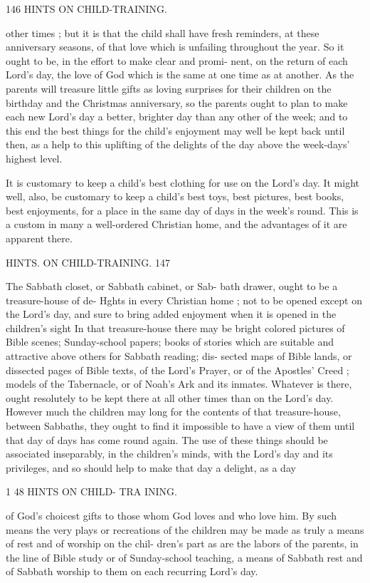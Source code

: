 \documentclass[
]{book}
\begin{document}
146 HINTS ON CHILD-TRAINING.

other times ; but it is that the child shall have fresh reminders, at these anniversary seasons, of that love which is unfailing throughout the year. So it ought to be, in the effort to make clear and promi- nent, on the return of each Lord's day, the love of God which is the same at one time as at another. As the parents will treasure little gifts as loving surprises for their children on the birthday and the Christmas anniversary, so the parents ought to plan to make each new Lord's day a better, brighter day than any other of the week; and to this end the best things for the child's enjoyment may well be kept back until then, as a help to this uplifting of the delights of the day above the week-days' highest level.

It is customary to keep a child's best clothing for use on the Lord's day. It might well, also, be customary to keep a child's best toys, best pictures, best books, best enjoyments, for a place in the same day of days in the week's round. This is a custom in many a well-ordered Christian home, and the advantages of it are apparent there.

HINTS. ON CHILD-TRAINING. 147

The Sabbath closet, or Sabbath cabinet, or Sab- bath drawer, ought to be a treasure-house of de- Hghts in every Christian home ; not to be opened except on the Lord's day, and sure to bring added enjoyment when it is opened in the children's sight In that treasure-house there may be bright colored pictures of Bible scenes; Sunday-school papers; books of stories which are suitable and attractive above others for Sabbath reading; dis- sected maps of Bible lands, or dissected pages of Bible texts, of the Lord's Prayer, or of the Apostles' Creed ; models of the Tabernacle, or of Noah's Ark and its inmates. Whatever is there, ought resolutely to be kept there at all other times than on the Lord's day. However much the children may long for the contents of that treasure-house, between Sabbaths, they ought to find it impossible to have a view of them until that day of days has come round again. The use of these things should be associated inseparably, in the children's minds, with the Lord's day and its privileges, and so should help to make that day a delight, as a day

1 48 HINTS ON CHILD- TRA INING.

of God's choicest gifts to those whom God loves and who love him. By such means the very plays or recreations of the children may be made as truly a means of rest and of worship on the chil- dren's part as are the labors of the parents, in the line of Bible study or of Sunday-school teaching, a means of Sabbath rest and of Sabbath worship to them on each recurring Lord's day.
\end{document}
